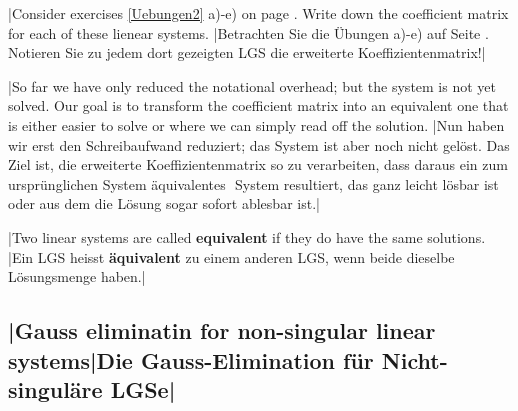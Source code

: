 \begin{exer}
\tr|Consider exercises \ref{Uebungen2} a)-e) on page \pageref{Uebungen2}. Write down the coefficient matrix for each of these lienear systems. 
   |Betrachten Sie die Übungen a)-e) auf Seite \pageref{Uebungen2}.  Notieren Sie zu jedem dort gezeigten LGS die erweiterte Koeffizientenmatrix!|
\end{exer}
\par\medskip
\tr|So far we have only reduced the notational overhead; but the system is not yet solved.
    Our goal is to transform the coefficient matrix into an equivalent one that is either easier to solve
    or where we can simply read off the solution.
   |Nun haben wir erst den Schreibaufwand reduziert; das System ist aber noch nicht gelöst.
    Das Ziel ist, die erweiterte Koeffizientenmatrix so zu verarbeiten, dass daraus ein zum ursprünglichen System \glqq äquivalentes \grqq$ $ System resultiert,
    das ganz leicht lösbar ist oder aus dem die Lösung sogar sofort ablesbar ist.|

\begin{tcolorbox}[colback=white]
\begin{definition}
  \tr|Two linear systems are called \textbf{equivalent} if they do have the same solutions.
     |Ein LGS heisst \textbf{äquivalent} zu einem anderen LGS, wenn beide dieselbe Lösungsmenge haben.|
\end{definition}
\end{tcolorbox}




\newpage

\subsection{\tr|Gauss eliminatin for non-singular linear systems|Die Gauss-Elimination für Nicht-singuläre LGSe|}

